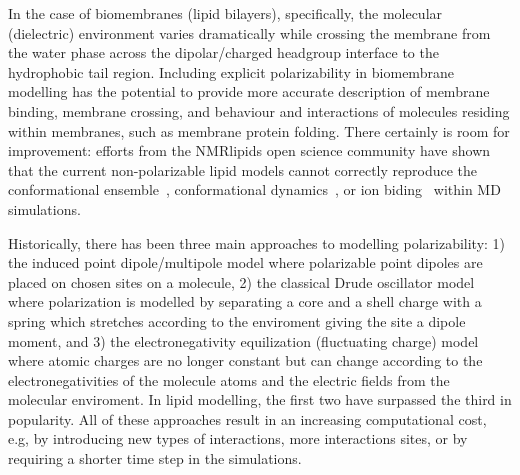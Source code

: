 \documentclass[journal=jacsat,manuscript=article,layout=singlecolumn]{achemso}
\begin{document}
In the case of biomembranes (lipid bilayers), specifically, the molecular (dielectric) environment varies dramatically while crossing the membrane from the water phase across the dipolar/charged headgroup interface to the hydrophobic tail region. Including explicit polarizability in biomembrane modelling has the potential to provide more accurate description of membrane binding, membrane crossing, and behaviour and interactions of molecules residing within membranes, such as membrane protein folding. There certainly is room for improvement: efforts from the NMRlipids open science community have shown that the current non-polarizable lipid models cannot correctly reproduce the conformational ensemble~\cite{Botan2015,Antila2019}, conformational dynamics~\cite{Antila2021}, or ion biding~\cite{Catte2016} within MD simulations. 

Historically, there has been three main approaches to modelling polarizability: 1) the induced point dipole/multipole model where polarizable point dipoles are placed on chosen sites on a molecule, 2) the classical Drude oscillator model where polarization is modelled by separating a core and a shell charge with a spring which stretches according to the enviroment giving the site a dipole moment, and 3) the electronegativity equilization (fluctuating charge) model where atomic charges are no longer constant but can change according to the electronegativities of the molecule atoms and the electric fields from the molecular enviroment. In lipid modelling, the first two have surpassed the third in popularity. All of these approaches result in an increasing computational cost, e.g, by introducing new types of interactions, more interactions sites, or by requiring a shorter time step in the simulations.


\end{document}
